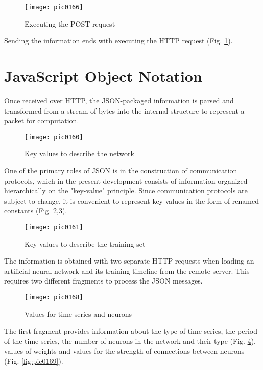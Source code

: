 \begin{figure}[h]
\centering
\texttt{[image: pic0166]}
\caption{Executing the POST request}
\label{fig:pic0166}
\end{figure}
\FloatBarrier

Sending the information ends with executing the HTTP request (Fig. \ref{fig:pic0166}).

\section{JavaScript Object Notation}

Once received over HTTP, the JSON-packaged information is parsed and transformed from a stream of bytes into the internal structure to represent a packet for computation.

\begin{figure}[h]
\centering
\texttt{[image: pic0160]}
\caption{Key values to describe the network}
\label{fig:pic0160}
\end{figure}
\FloatBarrier

One of the primary roles of JSON is in the construction of communication protocols, which in the present development consists of information organized hierarchically on the "key-value" principle. Since communication protocols are subject to change, it is convenient to represent key values in the form of renamed constants (Fig. \ref{fig:pic0160},\ref{fig:pic0161}).

\begin{figure}[h]
\centering
\texttt{[image: pic0161]}
\caption{Key values to describe the training set}
\label{fig:pic0161}
\end{figure}
\FloatBarrier

The information is obtained with two separate HTTP requests when loading an artificial neural network and its training timeline from the remote server. This requires two different fragments to process the JSON messages.

\begin{figure}[h]
\centering
\texttt{[image: pic0168]}
\caption{Values for time series and neurons}
\label{fig:pic0168}
\end{figure}
\FloatBarrier

The first fragment provides information about the type of time series, the period of the time series, the number of neurons in the network and their type (Fig. \ref{fig:pic0168}), values of weights and values for the strength of connections between neurons (Fig. \ref{fig:pic0169}).

